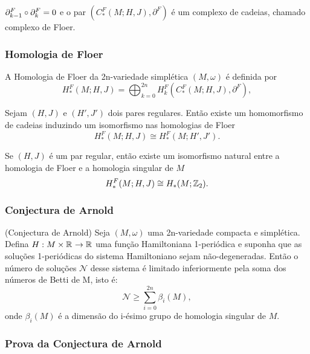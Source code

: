 \documentclass{beamer}
\begin{document}
\begin{footnotesize}
\begin{frame}
\begin{itemize}
			\end{itemize}
		
		\begin{teorema}
			 $\partial_{k-1}^{F}\circ\partial_{k}^{F} = 0$ e o par $(C^{F}_{*}(M;H,J), \partial^{F})$ é um complexo de cadeias, chamado complexo de Floer.
		\end{teorema}
	\end{frame}
	
		\begin{frame}
		\frametitle{Homologia de Floer}
			A Homologia de Floer da 2n-variedade simplética $(M,\omega)$ é definida por 
			$$
			H^{F}_{*}(M;H,J)=\bigoplus_{k=0}^{2n}H^{F}_{k}(C^{F}_{*}(M;H,J), \partial^{F}),
			$$
			
			\begin{teorema}
				Sejam $(H,J)$ e $(H',J')$ dois pares regulares. Então existe um homomorfismo de cadeias induzindo um isomorfismo nas homologias de Floer
				$$
				H^{F}_{*}(M;H,J) \cong 	H^{F}_{*}(M;H',J'). 
				$$
			\end{teorema}
			
			\begin{teorema}\label{teorema_isomorfismo_homologia_floer}
				Se $(H,J)$ é um par regular, então 
				existe um isomorfismo natural entre a homologia de Floer e a homologia singular de $M$
				$$
				H^{F}_{*}(M;H,J) \cong H_{*}(M;\mathbb{Z}_{2}). 
				$$
				
			\end{teorema}
			
	\end{frame}
	
	\begin{frame}
		\frametitle{Conjectura de Arnold}
		
			\begin{teorema}
				(Conjectura de Arnold) Seja $(M,\omega)$ uma 2n-variedade compacta e simplética. Defina $H:M\times \mathbb{R}^{} \to \mathbb{R}^{}$ uma função Hamiltoniana 1-periódica e suponha que as soluções 1-periódicas do sistema Hamiltoniano sejam não-degeneradas. Então o número de soluções $\mathcal{N}$ desse sistema é limitado inferiormente pela soma dos números de Betti de M, isto é:
				$$
				\mathcal{N}\geq \sum_{i=0}^{2n}\beta_{i}(M),
				$$
				onde $\beta_{i}(M)$ é a dimensão do i-ésimo grupo de homologia singular de $M$.
			\end{teorema}
	\end{frame}
	
	
	\begin{frame}
		\frametitle{Prova da Conjectura de Arnold}
			

\end{frame}
\end{footnotesize}
\end{document}
